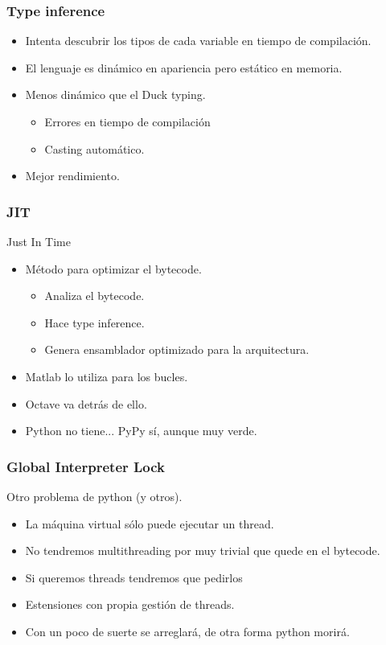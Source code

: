 \documentclass{beamer}
\begin{document}
\begin{frame}
  \frametitle{Type inference}
  \begin{itemize}
  \item Intenta descubrir los tipos de cada variable en tiempo de
    compilación.
  \item El lenguaje es dinámico en apariencia pero estático en
    memoria.
  \item Menos dinámico que el Duck typing.
    \begin{itemize}
    \item Errores en tiempo de compilación
    \item Casting automático.
    \end{itemize}
  \item Mejor rendimiento.
  \end{itemize}
\end{frame}

\begin{frame}
  \frametitle{JIT}
  Just In Time
  \begin{itemize}
  \item Método para optimizar el bytecode.
    \begin{itemize}
    \item Analiza el bytecode.
    \item Hace type inference.
    \item Genera ensamblador optimizado para la arquitectura.
    \end{itemize}
  \item Matlab lo utiliza para los bucles.
  \item Octave va detrás de ello.
  \item Python no tiene... PyPy sí, aunque muy verde.
  \end{itemize}
\end{frame}

\begin{frame}
  \frametitle{Global Interpreter Lock}
  Otro problema de python (y otros).
  \begin{itemize}
  \item La máquina virtual sólo puede ejecutar un thread.
  \item No tendremos multithreading por muy trivial que quede en el
    bytecode.
  \item Si queremos threads tendremos que pedirlos
  \item Estensiones con propia gestión de threads.
  \item Con un poco de suerte se arreglará, de otra forma python
    morirá.
  \end{itemize}
\end{frame}
\end{document}
